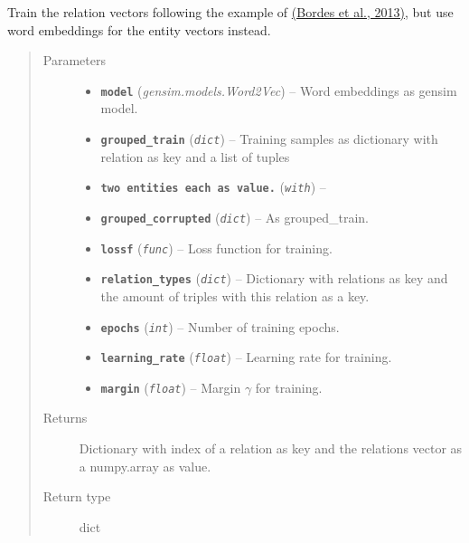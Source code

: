 \documentclass[letterpaper,10pt,english]{sphinxmanual}
\begin{document}

\begin{fulllineitems}
\label{src.trans_e:src.trans_e.trans_we.train}
Train the relation vectors following the example of \href{http://papers.nips.cc/paper/5071-translating-embeddings-for-modeling-multi-relational-data.pdf}{(Bordes et al.,
2013)},
but use word embeddings for the entity vectors instead.
\begin{quote}\begin{description}
\item[{Parameters}] \leavevmode\begin{itemize}
\item {} 
\textbf{\texttt{model}} (\emph{gensim.models.Word2Vec}) -- Word embeddings as gensim model.

\item {} 
\textbf{\texttt{grouped\_train}} (\emph{\texttt{dict}}) -- Training samples as dictionary with relation as key and a list of tuples

\item {} 
\textbf{\texttt{two entities each as value.}} (\emph{\texttt{with}}) -- 

\item {} 
\textbf{\texttt{grouped\_corrupted}} (\emph{\texttt{dict}}) -- As grouped\_train.

\item {} 
\textbf{\texttt{lossf}} (\emph{\texttt{func}}) -- Loss function for training.

\item {} 
\textbf{\texttt{relation\_types}} (\emph{\texttt{dict}}) -- Dictionary with relations as key and the amount of triples with this relation as a key.

\item {} 
\textbf{\texttt{epochs}} (\emph{\texttt{int}}) -- Number of training epochs.

\item {} 
\textbf{\texttt{learning\_rate}} (\emph{\texttt{float}}) -- Learning rate for training.

\item {} 
\textbf{\texttt{margin}} (\emph{\texttt{float}}) -- Margin \(\gamma\) for training.

\end{itemize}

\item[{Returns}] \leavevmode
Dictionary with index of a relation as key and the relations vector as a numpy.array as value.

\item[{Return type}] \leavevmode
dict

\end{description}\end{quote}

\end{fulllineitems}
\end{document}

